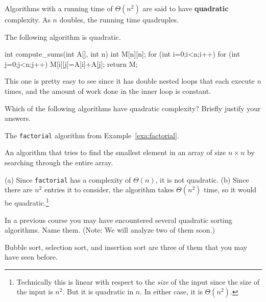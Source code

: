 \begin{df}[Quadratic]
Algorithms with a running time of $\Theta(n^2)$ are said to have {\bf quadratic} complexity.
As $n$ doubles, the running time quadruples.
\end{df}

\begin{exa}
The following algorithm is quadratic.
\begin{code}
    int compute_sums(int A[], int n) {
        int M[n][n];
        for (int i=0;i<n;i++) 
            for (int j=0;j<n;j++)
                M[i][j]=A[i]+A[j];
        return M;
    }
\end{code} 
This one is pretty easy to see since it has double nested loops that each
execute $n$ times, and the amount of work done in the inner loop is constant.
\end{exa}


\begin{exer}
Which of the following algorithms have quadratic complexity?   
Briefly justify your answers.
\begin{lenum}
\item
The \verb+factorial+ algorithm from Example~\ref{exa:factorial}.

\noindent
\answerlinetwo
\item
An algorithm that tries to find the smallest element in an array of size $n\times n$
by searching through the entire array.

\noindent
\answerlinetwo
\end{lenum}
\begin{answer}
(a) Since \verb+factorial+ has a complexity of $\Theta(n)$, it is not quadratic.
(b) Since there are $n^2$ entries it to consider, 
the algorithm takes $\Theta(n^2)$ time, so it would be quadratic.\footnote{Technically this is linear with respect to the {\em size} of the input since the
size of the input is $n^2$.  But it is quadratic in $n$.  In either case, it is
$\Theta(n^2)$.}
\end{answer}
\end{exer}


\begin{ques}
In a previous course you may have encountered several quadratic sorting algorithms.  Name them.
(Note: We will analyze two of them soon.)

\noindent
\answerline
\begin{answer}
Bubble sort, selection sort, and insertion sort are three of them that you may have seen before.
\end{answer}
\end{ques}

